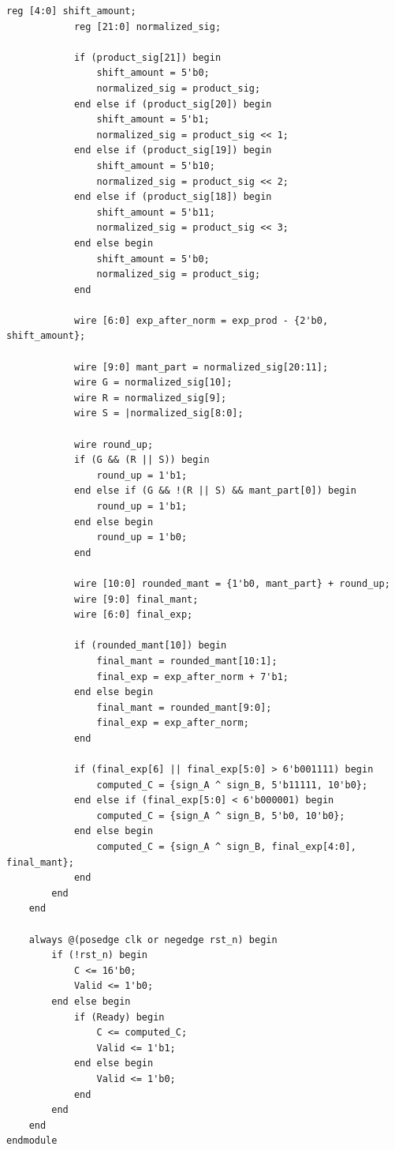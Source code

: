 \documentclass[UTF8]{ctexart}
\begin{document}
\begin{lstlisting}[frame=shadowbox,caption=vRTL251119111749\_415.v]
            reg [4:0] shift_amount;
            reg [21:0] normalized_sig;
            
            if (product_sig[21]) begin
                shift_amount = 5'b0;
                normalized_sig = product_sig;
            end else if (product_sig[20]) begin
                shift_amount = 5'b1;
                normalized_sig = product_sig << 1;
            end else if (product_sig[19]) begin
                shift_amount = 5'b10;
                normalized_sig = product_sig << 2;
            end else if (product_sig[18]) begin
                shift_amount = 5'b11;
                normalized_sig = product_sig << 3;
            end else begin
                shift_amount = 5'b0;
                normalized_sig = product_sig;
            end

            wire [6:0] exp_after_norm = exp_prod - {2'b0, shift_amount};

            wire [9:0] mant_part = normalized_sig[20:11];
            wire G = normalized_sig[10];
            wire R = normalized_sig[9];
            wire S = |normalized_sig[8:0];

            wire round_up;
            if (G && (R || S)) begin
                round_up = 1'b1;
            end else if (G && !(R || S) && mant_part[0]) begin
                round_up = 1'b1;
            end else begin
                round_up = 1'b0;
            end

            wire [10:0] rounded_mant = {1'b0, mant_part} + round_up;
            wire [9:0] final_mant;
            wire [6:0] final_exp;
            
            if (rounded_mant[10]) begin
                final_mant = rounded_mant[10:1];
                final_exp = exp_after_norm + 7'b1;
            end else begin
                final_mant = rounded_mant[9:0];
                final_exp = exp_after_norm;
            end

            if (final_exp[6] || final_exp[5:0] > 6'b001111) begin
                computed_C = {sign_A ^ sign_B, 5'b11111, 10'b0};
            end else if (final_exp[5:0] < 6'b000001) begin
                computed_C = {sign_A ^ sign_B, 5'b0, 10'b0};
            end else begin
                computed_C = {sign_A ^ sign_B, final_exp[4:0], final_mant};
            end
        end
    end

    always @(posedge clk or negedge rst_n) begin
        if (!rst_n) begin
            C <= 16'b0;
            Valid <= 1'b0;
        end else begin
            if (Ready) begin
                C <= computed_C;
                Valid <= 1'b1;
            end else begin
                Valid <= 1'b0;
            end
        end
    end
endmodule
\end{lstlisting}
\end{document}
